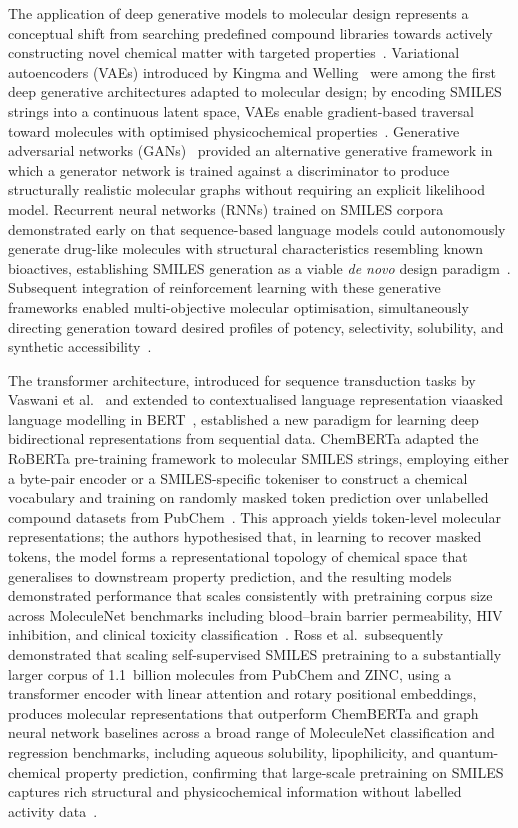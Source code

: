 \documentclass[a4paper,12pt]{article}
\begin{document}
The application of deep generative models to molecular design represents a
conceptual shift from searching predefined compound libraries towards actively
constructing novel chemical matter with targeted
properties~\cite{GomezBombarelli2018}.
Variational autoencoders (VAEs) introduced by Kingma and
Welling~\cite{Kingma2013} were among the first deep generative architectures
adapted to molecular design; by encoding SMILES strings into a continuous
latent space, VAEs enable gradient-based traversal toward molecules with
optimised physicochemical properties~\cite{GomezBombarelli2018}.
Generative adversarial networks (GANs)~\cite{Goodfellow2014} provided an
alternative generative framework in which a generator network is trained
against a discriminator to produce structurally realistic molecular graphs
without requiring an explicit likelihood model.
Recurrent neural networks (RNNs) trained on SMILES corpora demonstrated early
on that sequence-based language models could autonomously generate drug-like
molecules with structural characteristics resembling known bioactives,
establishing SMILES generation as a viable \textit{de novo} design
paradigm~\cite{Segler2018}.
Subsequent integration of reinforcement learning with these generative
frameworks enabled multi-objective molecular optimisation, simultaneously
directing generation toward desired profiles of potency, selectivity,
solubility, and synthetic accessibility~\cite{Olivecrona2017}.


The transformer architecture, introduced for sequence transduction tasks by
Vaswani et al.~\cite{Vaswani2017} and extended to contextualised language
representation viaasked language modelling in BERT~\cite{Devlin2018},
established a new paradigm for learning deep bidirectional representations
from sequential data.
ChemBERTa adapted the RoBERTa pre-training framework to molecular SMILES
strings, employing either a byte-pair encoder or a SMILES-specific tokeniser
to construct a chemical vocabulary and training on randomly masked token
prediction over unlabelled compound datasets from
PubChem~\cite{chithrananda2020chemberta}.
This approach yields token-level molecular representations; the authors
hypothesised that, in learning to recover masked tokens, the model forms a
representational topology of chemical space that generalises to downstream
property prediction, and the resulting models demonstrated performance that
scales consistently with pretraining corpus size across MoleculeNet benchmarks
including blood--brain barrier permeability, HIV inhibition, and clinical
toxicity classification~\cite{chithrananda2020chemberta}.
Ross et al.\ subsequently demonstrated that scaling self-supervised SMILES
pretraining to a substantially larger corpus of 1.1~billion molecules from
PubChem and ZINC, using a transformer encoder with linear attention and
rotary positional embeddings, produces molecular representations that
outperform ChemBERTa and graph neural network baselines across a broad range
of MoleculeNet classification and regression benchmarks, including aqueous
solubility, lipophilicity, and quantum-chemical property prediction,
confirming that large-scale pretraining on SMILES captures rich structural
and physicochemical information without labelled activity data~\cite{Ross2022}.
\end{document}
